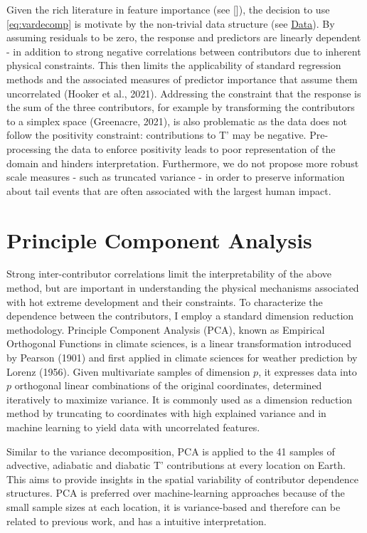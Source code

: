 \documentclass[11pt,a4paper,twoside,openright]{report}
\theoremstyle{definition}
\begin{document}
Given the rich literature in feature importance (see {[}{]}), the decision to use \eqref{eq:vardecomp} is motivate by the non-trivial data structure (see \hyperref[data]{Data}). By assuming residuals to be zero, the response and predictors are linearly dependent - in addition to strong negative correlations between contributors due to inherent physical constraints. This then limits the applicability of standard regression methods and the associated measures of predictor importance that assume them uncorrelated (Hooker et al., 2021). Addressing the constraint that the response is the sum of the three contributors, for example by transforming the contributors to a simplex space (Greenacre, 2021), is also problematic as the data does not follow the positivity constraint: contributions to T' may be negative. Pre-processing the data to enforce positivity leads to poor representation of the domain and hinders interpretation. Furthermore, we do not propose more robust scale measures - such as truncated variance - in order to preserve information about tail events that are often associated with the largest human impact.

\section{Principle Component Analysis}\label{principle-component-analysis}

Strong inter-contributor correlations limit the interpretability of the above method, but are important in understanding the physical mechanisms associated with hot extreme development and their constraints. To characterize the dependence between the contributors, I employ a standard dimension reduction methodology. Principle Component Analysis (PCA), known as Empirical Orthogonal Functions in climate sciences, is a linear transformation introduced by Pearson (1901) and first applied in climate sciences for weather prediction by Lorenz (1956). Given multivariate samples of dimension \(p\), it expresses data into \(p\) orthogonal linear combinations of the original coordinates, determined iteratively to maximize variance. It is commonly used as a dimension reduction method by truncating to coordinates with high explained variance and in machine learning to yield data with uncorrelated features.

Similar to the variance decomposition, PCA is applied to the 41 samples of advective, adiabatic and diabatic T' contributions at every location on Earth. This aims to provide insights in the spatial variability of contributor dependence structures. PCA is preferred over machine-learning approaches because of the small sample sizes at each location, it is variance-based and therefore can be related to previous work, and has a intuitive interpretation.
\end{document}
